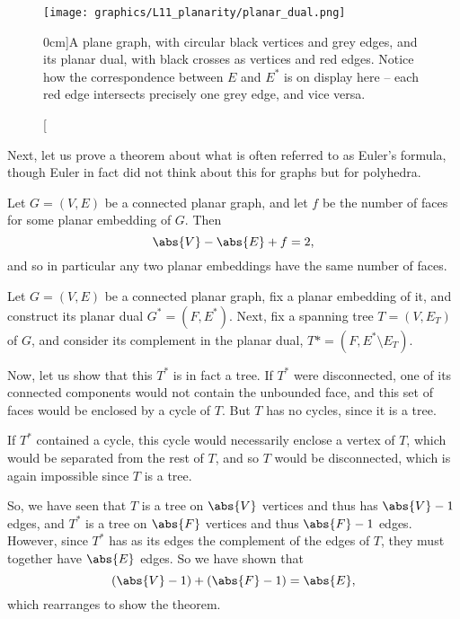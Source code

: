 \documentclass[nobib]{tufte-handout}
\begin{document}
\begin{figure}
  \centering
  \texttt{[image: graphics/L11\_planarity/planar\_dual.png]}
  \caption[][0cm]{A plane graph, with circular black vertices and grey edges, and its planar dual, with black crosses as vertices and red edges. Notice how the correspondence between $E$ and $E^*$ is on display here -- each red edge intersects precisely one grey edge, and vice versa.}
  \label{fig:planar_dual}
\end{figure}

Next, let us prove a theorem about what is often referred to as Euler's formula, though Euler in fact did not think about this for graphs but for polyhedra.

\begin{theorem}
  Let $G = (V,E)$ be a connected planar graph, and let $f$ be the number of faces for some planar embedding of $G$. Then
  $$\abs{V} - \abs{E} + f = 2,$$
  and so in particular any two planar embeddings have the same number of faces.

  \begin{definition}
    Let $G = (V,E)$ be a connected planar graph, fix a planar embedding of it, and construct its planar dual $G^* = (F, E^*)$. Next, fix a spanning tree $T = (V, E_T)$ of $G$, and consider its complement in the planar dual, $T* = (F, E^* \setminus E_T)$.

    Now, let us show that this $T^*$ is in fact a tree. If $T^*$ were disconnected, one of its connected components would not contain the unbounded face, and this set of faces would be enclosed by a cycle of $T$. But $T$ has no cycles, since it is a tree.

    If $T^*$ contained a cycle, this cycle would necessarily enclose a vertex of $T$, which would be separated from the rest of $T$, and so $T$ would be disconnected, which is again impossible since $T$ is a tree.

    So, we have seen that $T$ is a tree on $\abs{V}$ vertices and thus has $\abs{V} - 1$ edges, and $T^*$ is a tree on $\abs{F}$ vertices and thus $\abs{F}-1$ edges. However, since $T^*$ has as its edges the complement of the edges of $T$, they must together have $\abs{E}$ edges. So we have shown that
    $$\left(\abs{V} - 1\right) + \left(\abs{F} - 1\right) = \abs{E},$$
    which rearranges to show the theorem.
  \end{definition}
\end{theorem}
\end{document}
